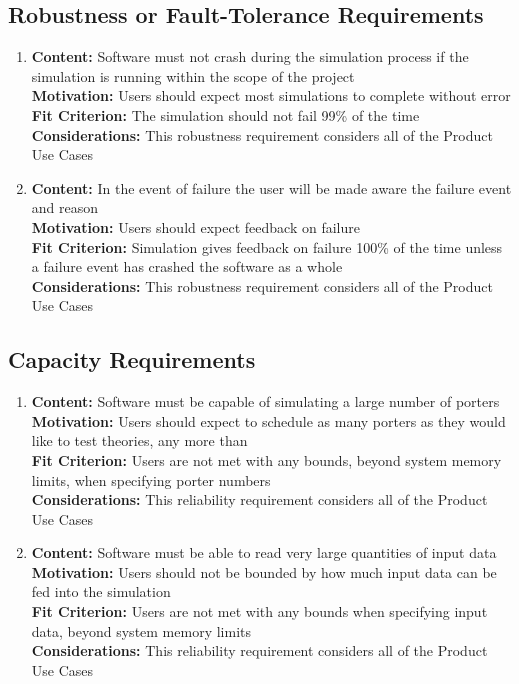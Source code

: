 \documentclass[paper=letter, fontsize=10pt]{scrartcl}
\numberwithin{equation}{section}		%
\numberwithin{figure}{section}			%
\numberwithin{table}{section}				%
\begin{document}
\subsection{Robustness or Fault-Tolerance Requirements}
	\begin{enumerate}
		\item \textbf{Content:} Software must not crash during the simulation process if the simulation is running within the scope of the project
		\\	  \textbf{Motivation:} Users should expect most simulations to complete without error
		\\	  \textbf{Fit Criterion:} The simulation should not fail 99\% of the time
		\\	  \textbf{Considerations:} This robustness requirement considers all of the Product Use Cases
		\item \textbf{Content:} In the event of failure the user will be made aware the failure event and reason
		\\	  \textbf{Motivation:} Users should expect feedback on failure
		\\	  \textbf{Fit Criterion:} Simulation gives feedback on failure 100\% of the time unless a failure event has crashed the software as a whole
		\\	  \textbf{Considerations:} This robustness requirement considers all of the Product Use Cases
	\end{enumerate}
\subsection{Capacity Requirements}
\begin{enumerate}
		\item \textbf{Content:} Software must be capable of simulating a large number of porters
		\\	  \textbf{Motivation:} Users should expect to schedule as many porters as they would like to test theories, any more than
		\\	  \textbf{Fit Criterion:} Users are not met with any bounds, beyond system memory limits, when specifying porter numbers
		\\	  \textbf{Considerations:} This reliability requirement considers all of the Product Use Cases 
		\item \textbf{Content:} Software must be able to read very large quantities of input data
		\\	  \textbf{Motivation:} Users should not be bounded by how much input data can be fed into the simulation
		\\	  \textbf{Fit Criterion:} Users are not met with any bounds when specifying input data, beyond system memory limits
		\\	  \textbf{Considerations:} This reliability requirement considers all of the Product Use Cases 
	\end{enumerate}
\end{document}
